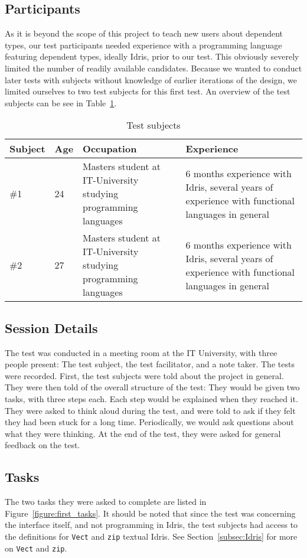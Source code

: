 \subsection{Participants}
As it is beyond the scope of this project to teach new users about dependent
types, our test participants needed experience with a programming language
featuring dependent types, ideally Idris, prior to our test. This obviously
severely limited the number of readily available candidates. Because we wanted
to conduct later tests with subjects without knowledge of earlier iterations of
the design, we limited ourselves to two test subjects for this first test. An
overview of the test subjects can be see in Table~\ref{table:first_test_subjects}.

\begin{table}[h]
\centering
\begin{tabular}{| l | l | p{5cm} | p{5cm} |}
\hline
Subject & Age & Occupation & Experience \\ \hline
\#1 & 24 & Masters student at IT-University studying programming languages & 6 months experience with Idris, several years of experience with functional languages in general \\ \hline
\#2 & 27 & Masters student at IT-University studying programming languages & 6 months experience with Idris, several years of experience with functional languages in general \\ \hline
\end{tabular}
\caption{Test subjects}
\label{table:first_test_subjects}
\end{table}

\subsection{Session Details}
The test was conducted in a meeting room at the IT University, with three
people present: The test subject, the test facilitator, and a note taker. The
tests were recorded. First, the test subjects were told about the project in
general. They were then told of the overall structure of the test: They would
be given two tasks, with three steps each. Each step would be explained when
they reached it. They were asked to think aloud during the test, and were told to
ask if they felt they had been stuck for a long time. Periodically, we would
ask questions about what they were thinking. At the end of the test, they were asked for general feedback on the test.

\subsection{Tasks}
The two tasks they were asked to complete are listed in Figure~\ref{figure:first_tasks}.
It should be noted that since the test was concerning the interface itself, and
not programming in Idris, the test subjects had access to the definitions for \texttt{Vect} and \texttt{zip} textual Idris. See Section~\ref{subsec:Idris}
for more on \texttt{Vect} and \texttt{zip}.

